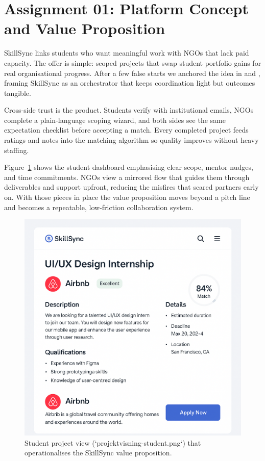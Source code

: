 \section*{Assignment 01: Platform Concept and Value Proposition}

SkillSync links students who want meaningful work with NGOs that lack paid capacity. The offer is simple: scoped projects that swap student portfolio gains for real organisational progress. After a few false starts we anchored the idea in \citet{Choudary2016} and \citet{Srnicek2017}, framing SkillSync as an orchestrator that keeps coordination light but outcomes tangible.

Cross-side trust is the product. Students verify with institutional emails, NGOs complete a plain-language scoping wizard, and both sides see the same expectation checklist before accepting a match. Every completed project feeds ratings and notes into the matching algorithm so quality improves without heavy staffing.

Figure~\ref{fig:student-view} shows the student dashboard emphasising clear scope, mentor nudges, and time commitments. NGOs view a mirrored flow that guides them through deliverables and support upfront, reducing the misfires that scared partners early on. With those pieces in place the value proposition moves beyond a pitch line and becomes a repeatable, low-friction collaboration system.

\begin{figure}[h]
  \centering
  \includegraphics[width=0.85\linewidth]{figures/opgave01/projektvisning-student.png}
  \caption{Student project view (`projektvisning-student.png`) that operationalises the SkillSync value proposition.}
  \label{fig:student-view}
\end{figure}
